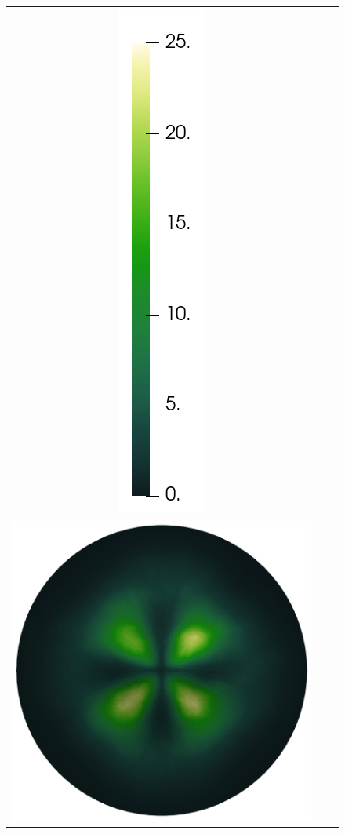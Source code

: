 \begin{figure}[H]
\begin{center}
\begin{tabular}[c]{c c c}
			\includegraphics[scale=.18]{velocityColorBar.png} \\
			\includegraphics[scale=.15]{recoveredVelocity_noglyphs.png} &

\end{tabular}
\end{center}
\end{figure}
